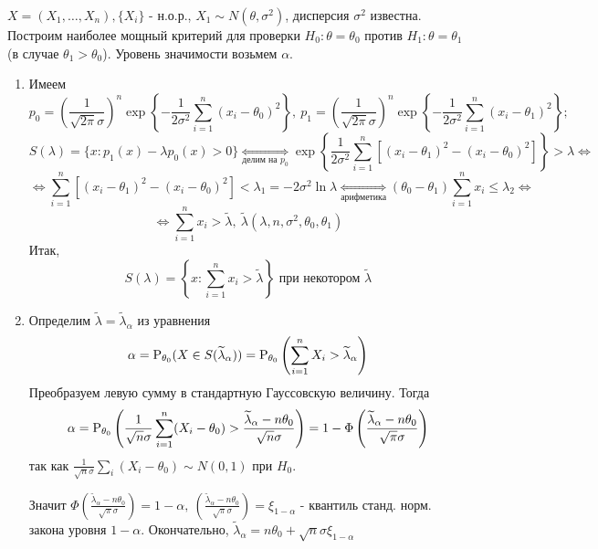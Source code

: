 \begin{example}
    \(X = (X_1,\ldots, X_n), \{X_i\}\) - н.о.р., \(X_1 \sim N(\theta, \sigma^2)\),
    дисперсия \(\sigma^2\) известна. Построим наиболее мощный критерий
    для проверки \(H_0: \theta = \theta_0\) против \(H_1: \theta = \theta_1\)
    (в случае \(\theta_1 > \theta_0\)). Уровень значимости возьмем \(\alpha\).
    \begin{enumerate}
        \item Имеем
        \[p_0 = \left(\frac{1}{\sqrt{2\pi}\sigma}\right)^n \exp{\left\{-\frac{1}{2\sigma^2} \sum^n_{i=1} (x_i -\theta_0)^2\right\}},\
        p_1 = \left(\frac{1}{\sqrt{2\pi}\sigma}\right)^n \exp{\left\{-\frac{1}{2\sigma^2} \sum^n_{i=1} (x_i -\theta_1)^2\right\}};\]
        \[S(\lambda) = \{x:p_1(x) - \lambda p_0(x) > 0\} \underset{\text{делим на }p_0}{\Leftrightarrow}
        \exp{\left\{\frac{1}{2\sigma^2}\sum_{i=1}^n\left[ (x_i-\theta_1)^2 -(x_i-\theta_0)^2 \right]\right\}} > \lambda\Leftrightarrow\]
        \[\Leftrightarrow \sum_{i=1}^n\left[(x_i - \theta_1)^2 - (x_i - \theta_0)^2\right] < \lambda_1 = -2\sigma^2\ln\lambda
        \underset{\text{арифметика}}{\Leftrightarrow} (\theta_0 - \theta_1)\sum_{i=1}^n x_i \leq\lambda_2 \Leftrightarrow\]
        \[\Leftrightarrow \sum_{i=1}^n x_i > \widetilde{\lambda},\ \widetilde{\lambda}(\lambda, n, \sigma^2, \theta_0, \theta_1)\]
        Итак,
        \[S(\lambda) = \left\{x: \sum_{i=1}^n x_i > \widetilde{\lambda}\right\} \text{ при некотором } \widetilde{\lambda}\]

        \item Определим \(\widetilde{\lambda} = \widetilde{\lambda}_\alpha\)
            из уравнения
            \[\alpha = \P_{\theta_0}(X \in S(\widetilde{\lambda}_\alpha)) =
            \P_{\theta_0}\left(\sum_{i=1}^n X_i > \widetilde{\lambda}_\alpha\right)\]
            Преобразуем левую сумму в стандартную Гауссовскую величину. Тогда
            \[\alpha = \P_{\theta_0}\left(\frac{1}{\sqrt{n} \sigma} \sum_{i=1}^n(X_i - \theta_0) > \frac{\widetilde{\lambda}_\alpha - n\theta_0}{\sqrt{n}\sigma}\right)=
            1 - \Phi\left(\frac{\widetilde{\lambda}_\alpha - n\theta_0}{\sqrt{\pi}\sigma}\right)\]
            так как \(\frac{1}{\sqrt{n}\sigma}\sum_{i} (X_i - \theta_0) \sim N(0, 1)\) при \(H_0\).

            Значит $\Phi\left(\frac{\widetilde{\lambda}_\alpha - n\theta_0}{\sqrt{\pi}\sigma}\right) = 1 - \alpha,\
            \left(\frac{\widetilde{\lambda}_\alpha - n\theta_0}{\sqrt{\pi}\sigma}\right) = \xi_{1-\alpha}$
             - квантиль станд. норм. закона уровня \(1 - \alpha\).
            Окончательно, \(\widetilde{\lambda}_\alpha = n\theta_0 + \sqrt{n}\sigma \xi_{1-\alpha}\)


\end{enumerate}
\end{example}
